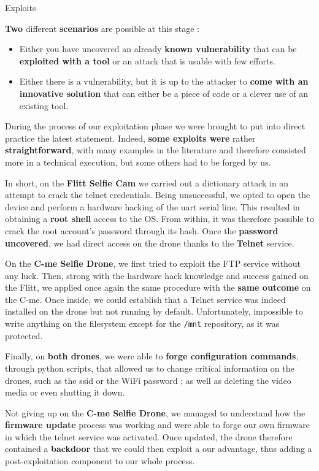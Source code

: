 \begin{chaptercover}{Exploits}
\begin{summary}
\textbf{Two} different \textbf{scenarios} are possible at this stage :
\begin{itemize}
  \item Either you have uncovered an already \textbf{known vulnerability} that can be \textbf{exploited with a tool} or an attack that is usable with few efforts.
  \item Either there is a vulnerability, but it is up to the attacker to \textbf{come with an innovative solution} that can either be a piece of code or a clever use of an existing tool.
\end{itemize}

During the process of our exploitation phase we were brought to put into direct practice the latest statement. Indeed, \textbf{some exploits were} rather \textbf{straightforward}, with many examples in the literature and therefore consisted more in a technical execution, but some others had to be forged by us.

In short, on the \textbf{Flitt Selfie Cam} we carried out a dictionary attack in an attempt to crack the telnet credentials. Being unsuccessful, we opted to open the device and perform a hardware hacking of the \acrshort{uart} serial line. This resulted in obtaining a \textbf{root shell} access to the OS. From within, it was therefore possible to crack the root account’s password through its hash. Once the \textbf{password uncovered}, we had direct access on the drone thanks to the \textbf{Telnet} service.

On the \textbf{C-me Selfie Drone}, we first tried to exploit the FTP service without any luck. Then, strong with the hardware hack knowledge and success gained on the Flitt, we applied once again the same procedure with the \textbf{same outcome} on the C-me. Once inside, we could establish that a Telnet service was indeed installed on the drone but not running by default. Unfortunately, impossible to write anything on the filesystem except for the \texttt{/mnt} repository, as it was protected.

Finally, on \textbf{both drones}, we were able to \textbf{forge configuration commands}, through python scripts, that allowed us to change critical information on the drones, such as the \acrshort{ssid} or the WiFi password ; as well as deleting the video media or even shutting it down.

Not giving up on the \textbf{C-me Selfie Drone}, we managed to understand how the \textbf{firmware update} process was working and were able to forge our own firmware in which the telnet service was activated. Once updated, the drone therefore contained a \textbf{backdoor} that we could then exploit a our advantage, thus adding a post-exploitation component to our whole process.
\end{summary}

\begin{discussion}
\end{discussion}

\end{chaptercover}
